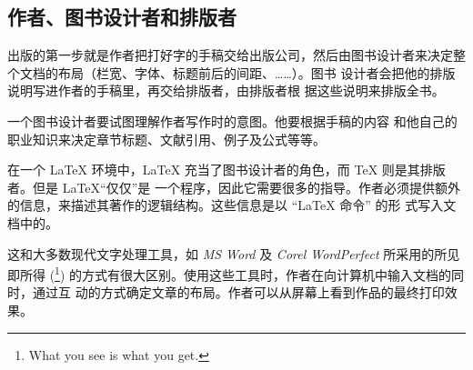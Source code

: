 \subsection{作者、图书设计者和排版者}

出版的第一步就是作者把打好字的手稿交给出版公司，然后由图书设计者来决定整个文档的布局（栏宽、字体、标题前后的间距、……）。图书
设计者会把他的排版说明写进作者的手稿里，再交给排版者，由排版者根
据这些说明来排版全书。


一个图书设计者要试图理解作者写作时的意图。他要根据手稿的内容
和他自己的职业知识来决定章节标题、文献引用、例子及公式等等。


在一个 \LaTeX{} 环境中，\LaTeX{} 充当了图书设计者的角色，而 \TeX{} 则是其排版者。但是 \LaTeX “仅仅”是
一个程序，因此它需要很多的指导。作者必须提供额外的信息，来描述其著作的逻辑结构。这些信息是以 “\LaTeX{} 命令” 的形
式写入文档中的。

这和大多数现代文字处理工具，如 \emph{MS Word} 及 \emph{Corel
WordPerfect} 所采用的所见即所得 (\footnote{What you see
is what you
get.}) 的方式有很大区别。使用这些工具时，作者在向计算机中输入文档的同时，通过互
动的方式确定文章的布局。作者可以从屏幕上看到作品的最终打印效果。

